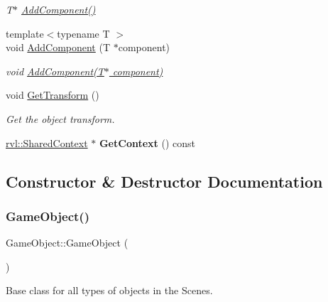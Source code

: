 \begin{DoxyCompactItemize}
\begin{DoxyCompactList}\small\item\em T$\ast$ \hyperlink{classrvl_1_1_game_object_a84757644ca964d0f24e003d35bec60a7}{Add\+Component()} \end{DoxyCompactList}\item 
{\footnotesize template$<$typename T $>$ }\\void \hyperlink{classrvl_1_1_game_object_a4b91502ba7295337f55c832dea27cf67}{Add\+Component} (T $\ast$component)
\begin{DoxyCompactList}\small\item\em void \hyperlink{classrvl_1_1_game_object_a4b91502ba7295337f55c832dea27cf67}{Add\+Component(\+T$\ast$ component)} \end{DoxyCompactList}\item 
void \hyperlink{classrvl_1_1_game_object_adfe0989dce9c2bf40a2b940595d7f6e3}{Get\+Transform} ()
\begin{DoxyCompactList}\small\item\em Get the object transform. \end{DoxyCompactList}\item 
\mbox{\label{classrvl_1_1_game_object_a07639eeda59c4469da56f52a4eefb8ad}} 
\hyperlink{structrvl_1_1_shared_context}{rvl\+::\+Shared\+Context} $\ast$ {\bfseries Get\+Context} () const
\end{DoxyCompactItemize}


\subsection{Constructor \& Destructor Documentation}
\mbox{\label{classrvl_1_1_game_object_a0348e3ee2e83d56eafca7a3547f432c4}} 
\subsubsection{\texorpdfstring{Game\+Object()}{GameObject()}}
{\footnotesize\ttfamily Game\+Object\+::\+Game\+Object (\begin{DoxyParamCaption}{ }\end{DoxyParamCaption})}

Base class for all types of objects in the Scenes. 

